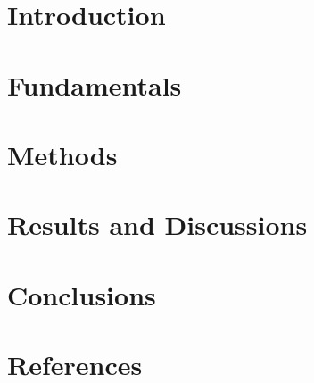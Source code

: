 \documentclass[]{csthesis}
\begin{document}

\maketitle







\thesisTables
\thesisBodyStart



\chapter{Introduction}


\chapter{Fundamentals}



\chapter{Methods}



\chapter{Results and Discussions}


\chapter{Conclusions}


\chapter{References}



\printReferences

\printLudography

\end{document}
